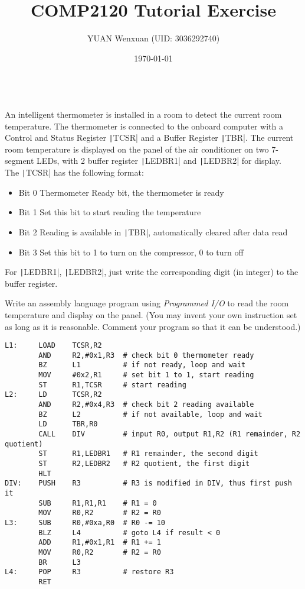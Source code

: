 \documentclass[answers]{exam}
\title{COMP2120 Tutorial Exercise}
\author{YUAN Wenxuan (UID: 3036292740)}
\date{\today}
\begin{document}
\maketitle

\begin{questions}

     \\
    An intelligent thermometer is installed in a room to detect the current room temperature.
    The thermometer is connected to the onboard computer with a Control and Status Register \texttt|TCSR| and a Buffer Register \texttt|TBR|.
    The current room temperature is displayed on the panel of the air conditioner on two 7-segment LEDs, with 2 buffer register \texttt|LEDBR1| and \texttt|LEDBR2| for display.\\
    The \texttt|TCSR| has the following format:
    \begin{itemize}
        \item[] Bit 0   Thermometer Ready bit, the thermometer is ready
        \item[] Bit 1   Set this bit to start reading the temperature
        \item[] Bit 2   Reading is available in \texttt|TBR|, automatically cleared after data read
        \item[] Bit 3   Set this bit to 1 to turn on the compressor, 0 to turn off
    \end{itemize}

    For \texttt|LEDBR1|, \texttt|LEDBR2|, just write the corresponding digit (in integer) to the buffer register.

    Write an assembly language program using \textit{Programmed I/O} to read the room temperature and display on the panel. (You may invent your own instruction set as long as it is reasonable. Comment your program so that it can be understood.)

    \begin{solution}
        \begin{verbatim}
L1:     LOAD    TCSR,R2
        AND     R2,#0x1,R3  # check bit 0 thermometer ready
        BZ      L1          # if not ready, loop and wait
        MOV     #0x2,R1     # set bit 1 to 1, start reading
        ST      R1,TCSR     # start reading
L2:     LD      TCSR,R2     
        AND     R2,#0x4,R3  # check bit 2 reading available
        BZ      L2          # if not available, loop and wait
        LD      TBR,R0
        CALL    DIV         # input R0, output R1,R2 (R1 remainder, R2 quotient)
        ST      R1,LEDBR1   # R1 remainder, the second digit
        ST      R2,LEDBR2   # R2 quotient, the first digit
        HLT
DIV:    PUSH    R3          # R3 is modified in DIV, thus first push it
        SUB     R1,R1,R1    # R1 = 0
        MOV     R0,R2       # R2 = R0
L3:     SUB     R0,#0xa,R0  # R0 -= 10
        BLZ     L4          # goto L4 if result < 0
        ADD     R1,#0x1,R1  # R1 += 1
        MOV     R0,R2       # R2 = R0
        BR      L3
L4:     POP     R3          # restore R3
        RET
    \end{verbatim}
    \end{solution}


\end{questions}
\end{document}

